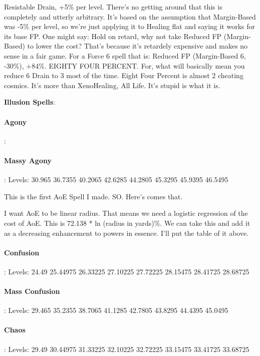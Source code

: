 \begin{multicols*}{2}
	Resistable Drain, +5\% per level. There's no getting around that this is completely and utterly arbitrary. It's based on the assumption that Margin-Based was -5\% per level, so we're just applying it to Healing flat and saying it works for its base FP. One might say: Hold on retard, why not take Reduced FP (Margin-Based) to lower the cost? That's because it's retardely expensive and makes no sense in a fair game. For a Force 6 spell that is: Reduced FP (Margin-Based 6, -30\%), +84\%. EIGHTY FOUR PERCENT. For, what will basically mean you reduce 6 Drain to 3 most of the time. Eight Four Percent is almost 2 cheating cosmics. It's more than XenoHealing, All Life. It's stupid is what it is.
	
	\textbf{Illusion Spells}:
	
	\paragraph{Agony}: 
	
	\paragraph{Massy Agony}: Levels: 30.965 36.7355 40.2065 42.6285 44.2805 45.3295 45.9395 46.5495
	
	This is the first AoE Spell I made. SO. Here's comes that.
	
	I want AoE to be linear radius. That means we need a logistic regression of the cost of AoE. This is 72.138 * ln (radius in yards)\%. We can take this and add it as a decreasing enhancement to powers in essence. I'll put the table of it above.
	
	\paragraph{Confusion}: Levels: 24.49 25.44975 26.33225 27.10225 27.72225 28.15475 28.41725 28.68725
	
	\paragraph{Mass Confusion}: Levels: 29.465 35.2355 38.7065 41.1285 42.7805 43.8295 44.4395 45.0495
	
	\paragraph{Chaos}: Levels: 29.49 30.44975 31.33225 32.10225 32.72225 33.15475 33.41725 33.68725
	

\end{multicols*}
